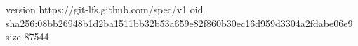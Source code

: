 version https://git-lfs.github.com/spec/v1
oid sha256:08bb26948b1d2ba1511bb32b53a659e82f860b30ec16d959d3304a2fdabe06e9
size 87544
